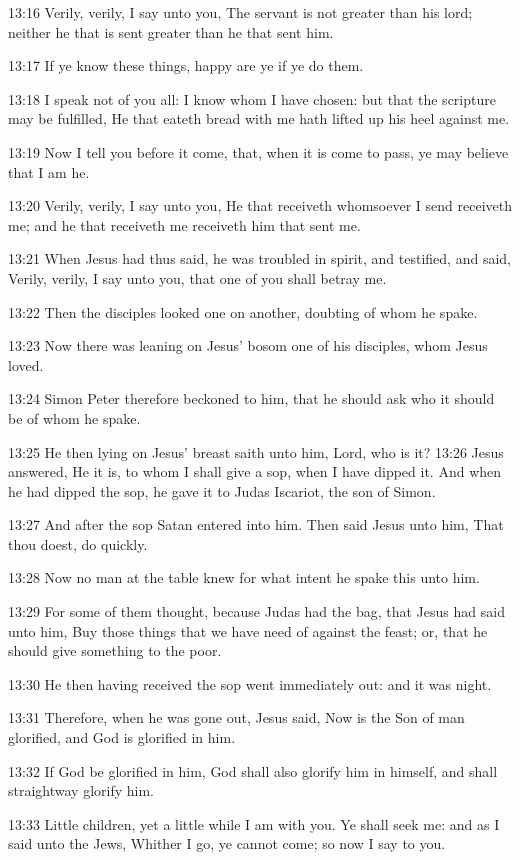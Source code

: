 13:16 Verily, verily, I say unto you, The servant is not greater than
his lord; neither he that is sent greater than he that sent him.

13:17 If ye know these things, happy are ye if ye do them.

13:18 I speak not of you all: I know whom I have chosen: but that the
scripture may be fulfilled, He that eateth bread with me hath lifted
up his heel against me.

13:19 Now I tell you before it come, that, when it is come to pass, ye
may believe that I am he.

13:20 Verily, verily, I say unto you, He that receiveth whomsoever I
send receiveth me; and he that receiveth me receiveth him that sent
me.

13:21 When Jesus had thus said, he was troubled in spirit, and
testified, and said, Verily, verily, I say unto you, that one of you
shall betray me.

13:22 Then the disciples looked one on another, doubting of whom he
spake.

13:23 Now there was leaning on Jesus' bosom one of his disciples, whom
Jesus loved.

13:24 Simon Peter therefore beckoned to him, that he should ask who it
should be of whom he spake.

13:25 He then lying on Jesus' breast saith unto him, Lord, who is it?
13:26 Jesus answered, He it is, to whom I shall give a sop, when I
have dipped it. And when he had dipped the sop, he gave it to Judas
Iscariot, the son of Simon.

13:27 And after the sop Satan entered into him. Then said Jesus unto
him, That thou doest, do quickly.

13:28 Now no man at the table knew for what intent he spake this unto
him.

13:29 For some of them thought, because Judas had the bag, that Jesus
had said unto him, Buy those things that we have need of against the
feast; or, that he should give something to the poor.

13:30 He then having received the sop went immediately out: and it was
night.

13:31 Therefore, when he was gone out, Jesus said, Now is the Son of
man glorified, and God is glorified in him.

13:32 If God be glorified in him, God shall also glorify him in
himself, and shall straightway glorify him.

13:33 Little children, yet a little while I am with you. Ye shall seek
me: and as I said unto the Jews, Whither I go, ye cannot come; so now
I say to you.

